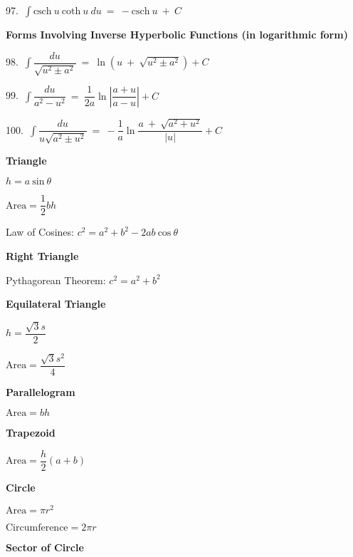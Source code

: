 \documentclass{article}
\begin{document}
\begin{large}
\begin{small}
97.\ $\displaystyle\int \text{csch}\ u\ \text{coth}\ u\ du\ =\ -\text{csch}\ u\ +\ C$

\textbf{Forms Involving Inverse Hyperbolic Functions (in logarithmic form)}

98.\ $\displaystyle\int \dfrac{du}{\sqrt{u^{2}\pm a^{2}}}\ =\ \ln(u\ +\ \sqrt{u^{2}\pm a^{2}}) + C$

99.\ $\displaystyle\int \dfrac{du}{a^{2}-u^{2}}\ =\ \dfrac{1}{2a}\ln\left|\dfrac{a+u}{a-u}\right| + C$

100.\ $\displaystyle\int \dfrac{du}{u\sqrt{a^{2}\pm u^{2}}}\ =\ -\dfrac{1}{a}\ln\dfrac{a\ +\ \sqrt{a^{2}+u^{2}}}{|u|} + C$

\end{small}

\newpage


\textbf{Triangle}

\hspace{0.1in} $h = a\ \text{sin}\ \theta$

\hspace{0.1in} $\text{Area} = \dfrac{1}{2}bh$

\hspace{0.1in} Law of Cosines: $c^{2} = a^{2} + b^{2} - 2ab\ \text{cos}\ \theta$

\textbf{Right Triangle}

\hspace{0.1in} Pythagorean Theorem: $c^{2} = a^{2} + b^{2}$

\textbf{Equilateral Triangle}

\hspace{0.1in} $h = \dfrac{\sqrt{3}s}{2}$

\hspace{0.1in} $\text{Area} = \dfrac{\sqrt{3}s^{2}}{4}$

\textbf{Parallelogram}

\hspace{0.1in} $\text{Area} = bh$

\textbf{Trapezoid}

\hspace{0.1in} $\text{Area} = \dfrac{h}{2}(a + b)$

\textbf{Circle}

\hspace{0.1in} $\text{Area} = \pi r^{2}$

\hspace{0.1in} $\text{Circumference} = 2\pi r$

\textbf{Sector of Circle}


\end{large}
\end{document}
